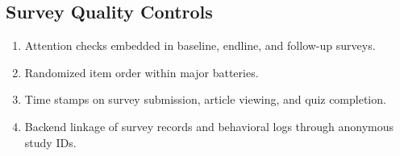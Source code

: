 \documentclass[12pt,american]{article}
\begin{document}
\subsection{Survey Quality Controls}\label{app:qc}

\begin{enumerate}[label=\arabic*., leftmargin=1.5em]
\item Attention checks embedded in baseline, endline, and follow-up surveys.
\item Randomized item order within major batteries.
\item Time stamps on survey submission, article viewing, and quiz completion.
\item Backend linkage of survey records and behavioral logs through anonymous study IDs.
\end{enumerate}

\clearpage
\singlespacing
{}
\label{app:refs}


\end{document}
